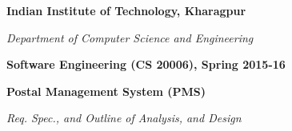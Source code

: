 \documentclass{article}
\begin{document}
\thispagestyle{plain}
\setcounter{page}{1}

\begin{center}
{\huge {\bf Indian Institute of Technology, Kharagpur}} 

{\LARGE {\em Department of Computer Science and Engineering}}
\vspace{0.4cm}

{\Large \bf Software Engineering (CS 20006), Spring 2015-16} \vspace{0.1cm}

{\large \bf Postal Management System (PMS)} \vspace{0.1cm}

{\large \em Req. Spec., and Outline of Analysis, and Design} %
\end{center}

\hspace{-1cm}

\begin{tabular}{l}
\hspace{16cm} \\ \hline 
\end{tabular}
\end{document}
